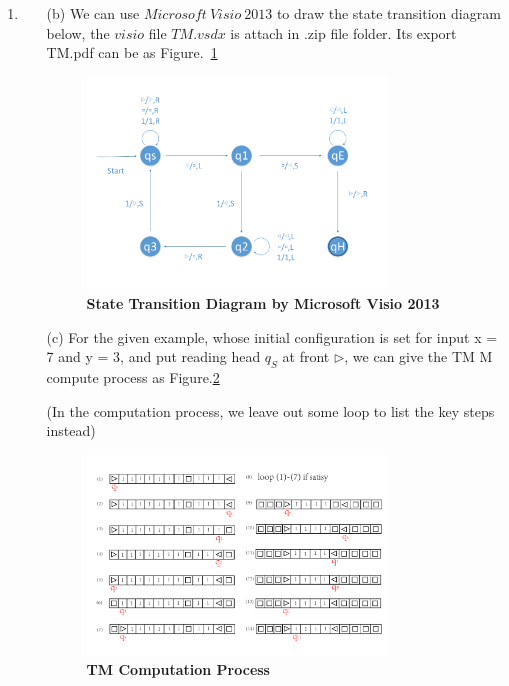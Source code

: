 \documentclass[12pt,a4paper]{article}
\makeatletter
\newtheorem*{solution}{Solution}
\theoremstyle{definition}
\renewenvironment{solution}[1][Solution] {\par\pushQED{\qed}\normalfont\topsep6\p@\@plus6\p@\relax\trivlist\item[\hskip\labelsep\bfseries#1\@addpunct{.}]\ignorespaces}{\popQED\endtrivlist\@endpefalse} \makeatother
\makeatother
\begin{document}
\begin{enumerate}
\begin{solution}
\begin{itemize}
\begin{itemize}
    \end{itemize}
    \item [(b)] We can use $Microsoft\ Visio\ 2013$ to draw the state transition diagram below, the $visio$ file $TM.vsdx$ is attach in .zip file folder. Its export TM.pdf can be as Figure.~\ref{Graph0}
    \begin{figure}[htbp]
        \centering
        \includegraphics[width=0.8\textwidth]{pictures/TM.pdf}
        \caption{\textbf{State Transition Diagram by Microsoft Visio 2013}}\label{Graph0}
    \end{figure}
    \item [(c)] For the given example, whose initial configuration is set for input x = 7 and y = 3, and put reading head $q_{S}$ at front $\triangleright$, we can give the TM M compute process as Figure.\ref{Graph1}\par (In the computation process, we leave out some loop to list the key steps instead)
    \begin{figure}[htbp]
        \centering
        \includegraphics[width=0.8\textwidth]{pictures/pic_1.pdf}
        \caption{\textbf{TM Computation Process}}\label{Graph1}
    \end{figure}
    \end{itemize}
    \end{solution}


\end{enumerate}
\end{document}
